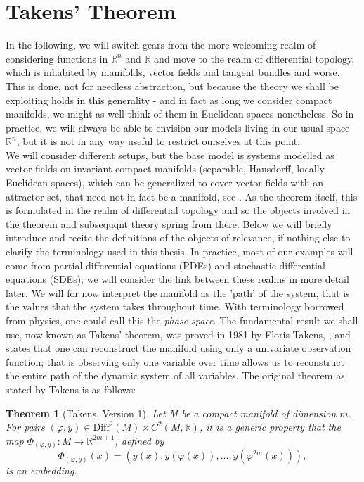 \documentclass[11pt, a4paper]{memoir}
\theoremstyle{break}
\newtheorem{thm}{Theorem}
\theoremstyle{break}
\theoremstyle{nonumberplain}
\newcommand{\mR}{\mathbb{R}}
\begin{document}
\section{Takens' Theorem}
In the following, we will switch gears from the more welcoming realm of considering functions in $\mR^n$ and $\mR$ and move to the realm of differential topology, which is inhabited by manifolds, vector fields and tangent bundles and worse. This is done, not for needless abstraction, but because the theory we shall be exploiting holds in this generality - and in fact as long we consider compact manifolds, we might as well think of them in Euclidean spaces nonetheless. So in practice, we will always be able to envision our models living in our usual space $\mR^n$, but it is not in any way useful to restrict ourselves at this point.\\
We will consider different setups, but the base model is systems modelled as vector fields on invariant compact manifolds (separable, Hausdorff, locally Euclidean spaces), which can be generalized to cover vector fields with an attractor set, that need not in fact be a manifold, see \cite{Sauer1991}. As the theorem itself, this is formulated in the realm of differential topology and so the objects involved in the theorem and subsequqnt theory spring from there. Below we will briefly introduce and recite the definitions of the objects of relevance, if nothing else to clarify the terminology used in this thesis. In practice, most of our examples will come from partial differential equations (PDEs) and stochastic differential equations (SDEs); we will consider the link between these realms in more detail later. We will for now interpret the manifold as the 'path' of the system, that is the values that the system takes throughout time. With terminology borrowed from physics, one could call this the \textit{phase space}. The fundamental result we shall use, now known as Takens' theorem, was proved in 1981 by Floris Takens, \cite{Takens}, and states that one can reconstruct the manifold using only a univariate observation function; that is observing only one variable over time allows us to reconstruct the entire path of the dynamic system of all variables. The original theorem as stated by Takens is as follows:
\begin{thm}[Takens, Version 1]
Let M be a compact manifold of dimension $m$. For pairs $(\varphi,y)\in \text{Diff}^2(M)\times C^2(M,\mathbb{R})$, it is a generic property that the map $\Phi_{(\varphi,y)}:M\to \mathbb{R}^{2m+1}$, defined by
$$\Phi_{(\varphi,y)}(x)=(y(x),y(\varphi(x)),...,y(\varphi^{2m}(x))),$$
is an embedding. \cite{Takens}
\end{thm}
\end{document}
